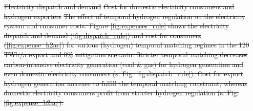 \documentclass[5p,numafflabel]{elsarticle}
\newcommand{\co}{\ce{CO2}~}
\def\co{CO${}_2${\:}}
\providecommand{\DIFdeltex}[1]{{\protect\color{red}\sout{#1}}}                      %
\providecommand{\DIFdelFL}[1]{\DIFdel{#1}} %
\providecommand{\DIFdel}[1]{\texorpdfstring{\DIFdeltex{#1}}{}} %
\begin{document}
{%
\DIFdelFL{Electricity dispatch and demand}}
{%
\DIFdelFL{Cost for domestic electricity consumers and hydrogen exporters}}
{%
\DIFdelFL{The effect of temporal hydrogen regulation on the electricity system and consumer costs.
    Figure \ref{fig:expenses_rule} shows the electricity dispatch and demand (\ref{fig:dispatch_rule}) and cost for consumers (\ref{fig:expense_h2ac}) for various (hydrogen) temporal matching regimes in the 120 TWh/a export and 0\% }%
\DIFdelFL{mitigation scenario. Stricter temporal matching decreases carbon-intensive electricity generation (coal \& gas) for hydrogen generation and even domestic electricity consumers (s. Fig. \ref{fig:dispatch_rule}). Cost for export hydrogen generation increase to fulfill the temporal matching constraint, whereas domestic electricity consumers profit from stricter hydrogen regulation (s. Fig. \ref{fig:expense_h2ac}).}}

\end{document}
